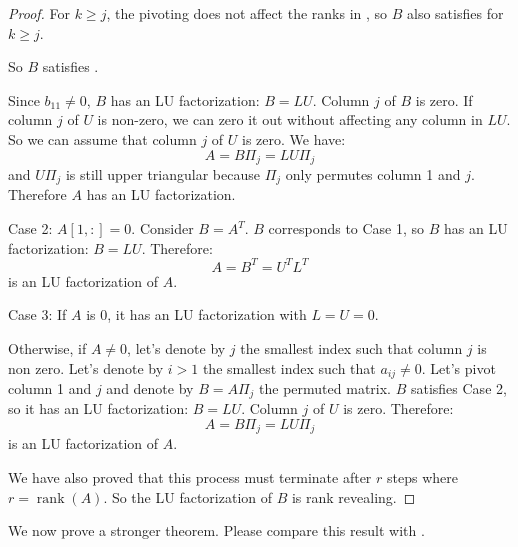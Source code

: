 \documentclass{article}
\DeclareMathOperator{\rk}{rank}
\begin{document}
\begin{proof}
    For $k \ge j$, the pivoting does not affect the ranks in , so $B$ also satisfies  for $k \ge j$.

    So $B$ satisfies .

    Since $b_{11} \neq 0$, $B$ has an LU factorization: $B = LU$. Column $j$ of $B$ is zero. If column $j$ of $U$ is non-zero, we can zero it out without affecting any column in $LU$. So we can assume that column $j$ of $U$ is zero. We have:
    \[ A = B \Pi_j = L U \Pi_j \]
    and $U \Pi_j$ is still upper triangular because $\Pi_j$ only permutes column 1 and $j$. Therefore $A$ has an LU factorization.

    Case 2: $A[1,:] = 0$. Consider $B = A^T$. $B$ corresponds to Case 1, so $B$ has an LU factorization: $B = L U$. Therefore:
    \[ A = B^T = U^T L^T \]
    is an LU factorization of $A$.

    Case 3: If $A$ is 0, it has an LU factorization with $L=U=0$.

    Otherwise, if $A \neq 0$, let's denote by $j$ the smallest index such that column $j$ is non zero. Let's denote by $i > 1$ the smallest index such that $a_{ij} \neq 0$. Let's pivot column 1 and $j$ and denote by $B = A \Pi_j$ the permuted matrix. $B$ satisfies Case 2, so it has an LU factorization: $B = L U$. Column $j$ of $U$ is zero. Therefore:
    \[ A = B \Pi_j = L U \Pi_j \]
    is an LU factorization of $A$.

    We have also proved that this process must terminate after $r$ steps where $r = \rk(A)$. So the LU factorization of $B$ is rank revealing.
\end{proof}

We now prove a stronger theorem. Please compare this result with .
\end{document}
